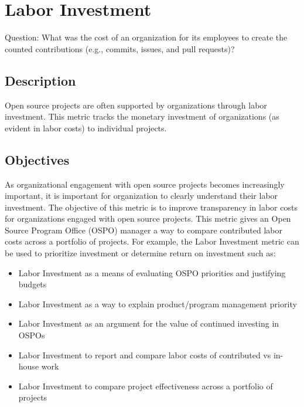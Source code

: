 \hypertarget{labor-investment}{%
\section{Labor Investment}\label{labor-investment}}

Question: What was the cost of an organization for its employees to
create the counted contributions (e.g., commits, issues, and pull
requests)?

\hypertarget{description}{%
\subsection{Description}\label{description}}

Open source projects are often supported by organizations through labor
investment. This metric tracks the monetary investment of organizations
(as evident in labor costs) to individual projects.

\hypertarget{objectives}{%
\subsection{Objectives}\label{objectives}}

As organizational engagement with open source projects becomes
increasingly important, it is important for organization to clearly
understand their labor investment. The objective of this metric is to
improve transparency in labor costs for organizations engaged with open
source projects. This metric gives an Open Source Program Office (OSPO)
manager a way to compare contributed labor costs across a portfolio of
projects. For example, the Labor Investment metric can be used to
prioritize investment or determine return on investment such as:

\begin{itemize}
\tightlist
\item
  Labor Investment as a means of evaluating OSPO priorities and
  justifying budgets
\item
  Labor Investment as a way to explain product/program management
  priority
\item
  Labor Investment as an argument for the value of continued investing
  in OSPOs
\item
  Labor Investment to report and compare labor costs of contributed vs
  in-house work
\item
  Labor Investment to compare project effectiveness across a portfolio
  of projects
\end{itemize}

